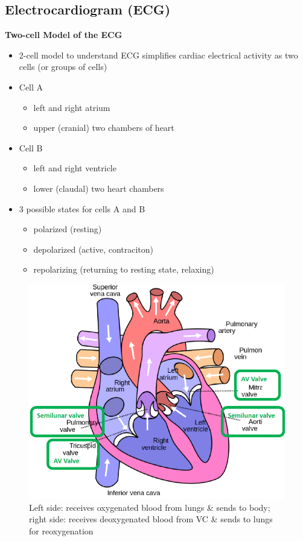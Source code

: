\documentclass[11pt,fleqn]{book}
\begin{document}
\subsection{Electrocardiogram (ECG)}
\textbf{Two-cell Model of the ECG}
\begin{itemize}
    \item 2-cell model to
understand ECG
simplifies cardiac
electrical activity
as two cells (or
groups of cells)
    \item Cell A
    \begin{itemize}
        \item left and right atrium
        \item upper (cranial) two chambers of heart
    \end{itemize}
    \item Cell B
    \begin{itemize}
        \item left and right ventricle
        \item lower (claudal) two heart chambers
    \end{itemize}
    \item 3 possible states for cells A and B
    \begin{itemize}
        \item polarized (resting)
        \item depolarized (active, contraciton)
        \item repolarizing (returning to resting state, relaxing)
    \end{itemize}
\end{itemize}

\begin{figure}[h!]
\begin{center}
    \includegraphics[width=0.5\linewidth]{Pictures/Screenshot 2024-04-03 233656.png}
    \caption{Left side: receives oxygenated
blood from lungs \& sends to body; right side: receives deoxygenated
blood from VC \& sends to lungs
for reoxygenation}
\end{center}
\end{figure}
\end{document}
